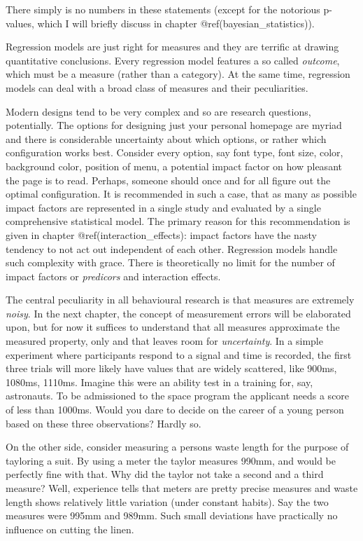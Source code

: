 \documentclass[]{svmono}
\theoremstyle{definition}
\theoremstyle{definition}
\theoremstyle{definition}
\theoremstyle{remark}
\begin{document}
There simply is no numbers in these statements (except for the notorious
p-values, which I will briefly discuss in chapter
@ref(bayesian\_statistics)).

Regression models are just right for measures and they are terrific at
drawing quantitative conclusions. Every regression model features a so
called \emph{outcome}, which must be a measure (rather than a category).
At the same time, regression models can deal with a broad class of
measures and their peculiarities.

Modern designs tend to be very complex and so are research questions,
potentially. The options for designing just your personal homepage are
myriad and there is considerable uncertainty about which options, or
rather which configuration works best. Consider every option, say font
type, font size, color, background color, position of menu, a potential
impact factor on how pleasant the page is to read. Perhaps, someone
should once and for all figure out the optimal configuration. It is
recommended in such a case, that as many as possible impact factors are
represented in a single study and evaluated by a single comprehensive
statistical model. The primary reason for this recommendation is given
in chapter @ref(interaction\_effects): impact factors have the nasty
tendency to not act out independent of each other. Regression models
handle such complexity with grace. There is theoretically no limit for
the number of impact factors or \emph{predicors} and interaction
effects.

The central peculiarity in all behavioural research is that measures are
extremely \emph{noisy}. In the next chapter, the concept of measurement
errors will be elaborated upon, but for now it suffices to understand
that all measures approximate the measured property, only and that
leaves room for \emph{uncertainty}. In a simple experiment where
participants respond to a signal and time is recorded, the first three
trials will more likely have values that are widely scattered, like
900ms, 1080ms, 1110ms. Imagine this were an ability test in a training
for, say, astronauts. To be admissioned to the space program the
applicant needs a score of less than 1000ms. Would you dare to decide on
the career of a young person based on these three observations? Hardly
so.

On the other side, consider measuring a persons waste length for the
purpose of tayloring a suit. By using a meter the taylor measures 990mm,
and would be perfectly fine with that. Why did the taylor not take a
second and a third measure? Well, experience tells that meters are
pretty precise measures and waste length shows relatively little
variation (under constant habits). Say the two measures were 995mm and
989mm. Such small deviations have practically no influence on cutting
the linen.
\end{document}
